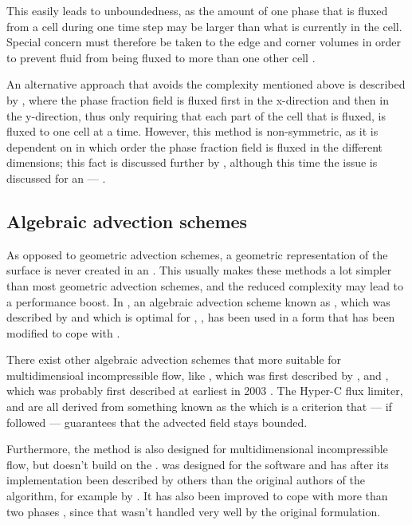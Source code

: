 This easily leads to unboundedness, as the amount of one phase that is fluxed from a cell during one time step may be larger than what is currently in the cell. Special concern must therefore be taken to the edge and corner volumes in order to prevent fluid from being fluxed to more than one other cell \citep{Rider1997}.

An alternative approach that avoids the complexity mentioned above is described by \citet{Aulisa2003}, where the phase fraction field is fluxed first in the x-direction and then in the y-direction, thus only requiring that each part of the cell that is fluxed, is fluxed to one cell at a time. However, this method is non-symmetric, as it is dependent on in which order the phase fraction field is fluxed in the different dimensions; this fact is discussed further by \citet{Ubbink1999}, although this time the issue is discussed for an  --- \CICSAM.

\subsection{Algebraic advection schemes}

As opposed to geometric advection schemes, a geometric representation of the surface is never created in an . This usually makes these methods a lot simpler than most geometric advection schemes, and the reduced complexity may lead to a performance boost. In \thisprojectwork, an algebraic advection scheme known as , which was described by \citet{Leonard1988} and which is optimal for , , has been used in a form that has been modified to cope with .

There exist other algebraic advection schemes that more suitable for multidimensioal incompressible flow, like \CICSAM, which was first described by \citet{Ubbink1999}, and \STACS, which was probably first described at earliest in 2003 \citep{Darwish}. The Hyper-C flux limiter, \CICSAM and \STACS are all derived from something known as the \CBC which is a criterion that --- if followed --- guarantees that the advected field stays bounded.

Furthermore, the \MULES method is also designed for multidimensional incompressible flow, but doesn't build on the \CBC. \MULES was designed for the  software  and has after its implementation been described by others than the original authors of the algorithm, for example by \citet{Berberovi2009}. It has also been improved to cope with more than two phases \citep{Kissling2010}, since that wasn't handled very well by the original formulation.

